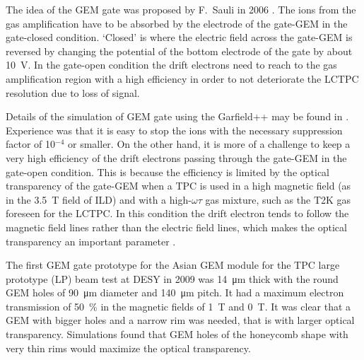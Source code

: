The idea of the GEM gate was proposed by F.~Sauli in 2006 \cite{Sauli2006_gate}.
The ions from the gas amplification have to be absorbed by the electrode of the gate-GEM in the gate-closed condition.
`Closed' is where the electric field across the gate-GEM is reversed by changing the potential of the bottom
electrode of the gate by about \SI{10}{\volt}. In the gate-open condition the drift electrons need to reach
to the gas amplification region with a high efficiency in order to not deteriorate the LCTPC resolution
due to loss of signal.

Details of the simulation of GEM gate using the Garfield++ may be found in \cite{LCTPCJap-IonGate}. Experience was that it is easy
to stop the ions with the necessary suppression factor of 10$^{-4}$ or smaller. On the other hand, it is more
of a challenge to keep a very high efficiency of the drift electrons passing through the gate-GEM in the gate-open
condition. This is because the efficiency is limited by the optical transparency of the gate-GEM when a TPC
is used in a high magnetic field (as in the \SI{3.5}{\tesla} field of ILD) and with a high-$\omega\tau$ gas mixture,
such as the T2K gas \cite{ref4T2Kgas_tdr,ref4T2Kgas_ishikawa,ref4T2Kgas_kobayashi} foreseen for the LCTPC. In this condition the drift electron tends to follow the
magnetic field lines rather than the electric field lines, which makes the optical transparency an important parameter .

The first GEM gate prototype for the Asian GEM module for the TPC large prototype (LP) beam test at
DESY in 2009 was \SI{14}{\micro\meter} thick with the round GEM holes of
\SI{90}{\micro\meter} diameter and \SI{140}{\micro\meter} pitch. It had a maximum electron
transmission of \SI{50}{\percent} in the magnetic fields of \SI{1}{\tesla} and \SI{0}{\tesla}. It was clear that a GEM
with bigger holes and a narrow rim was needed, that is with larger optical transparency. Simulations found that
GEM holes of the honeycomb shape with very thin rims would maximize the optical transparency.

